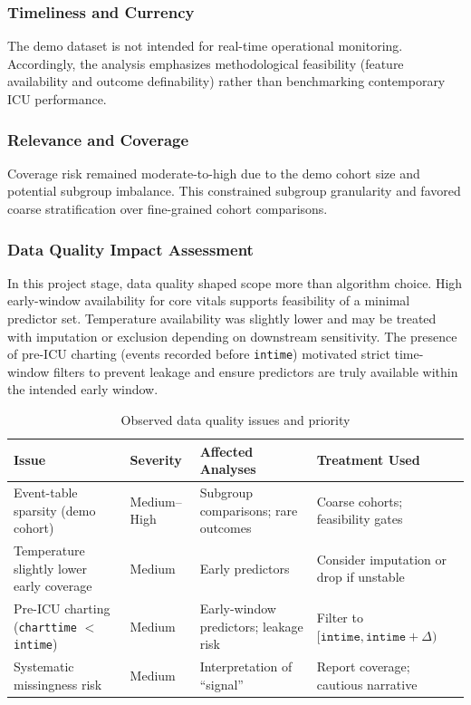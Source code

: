\documentclass[12pt]{article}
\begin{document}
\subsubsection*{Timeliness and Currency}
The demo dataset is not intended for real-time operational monitoring. Accordingly, the analysis emphasizes methodological feasibility (feature availability and outcome definability) rather than benchmarking contemporary ICU performance.

\subsubsection*{Relevance and Coverage}
Coverage risk remained moderate-to-high due to the demo cohort size and potential subgroup imbalance. This constrained subgroup granularity and favored coarse stratification over fine-grained cohort comparisons.

\subsubsection*{Data Quality Impact Assessment}
In this project stage, data quality shaped scope more than algorithm choice. High early-window availability for core vitals supports feasibility of a minimal predictor set. Temperature availability was slightly lower and may be treated with imputation or exclusion depending on downstream sensitivity. The presence of pre-ICU charting (events recorded before \texttt{intime}) motivated strict time-window filters to prevent leakage and ensure predictors are truly available within the intended early window.

\begin{table}[H]
\centering
\caption{Observed data quality issues and priority}
\label{tab:data_quality}
\begin{tabular}{p{4.0cm} p{2.6cm} p{3.4cm} p{3.2cm}}
\toprule
\textbf{Issue} & \textbf{Severity} & \textbf{Affected Analyses} & \textbf{Treatment Used} \\
\midrule
Event-table sparsity (demo cohort) & Medium--High & Subgroup comparisons; rare outcomes & Coarse cohorts; feasibility gates \\
Temperature slightly lower early coverage & Medium & Early predictors & Consider imputation or drop if unstable \\
Pre-ICU charting (\texttt{charttime} $<$ \texttt{intime}) & Medium & Early-window predictors; leakage risk & Filter to \([\texttt{intime}, \texttt{intime}+\Delta)\) \\
Systematic missingness risk & Medium & Interpretation of ``signal'' & Report coverage; cautious narrative \\
\bottomrule
\end{tabular}
\end{table}
\end{document}
